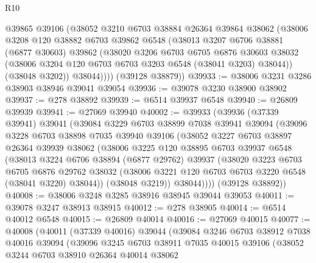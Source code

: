 \begin{lexlean}{R10}
\begin{coremodule}
          @39865
          @39106
          (@38052
            @3210
            @6703
            @38884
            @26364
            @39864
            @38062
            (@38006
              @3208
              @120
              @38882
              @6703
              @39862
              @6548
              (@38013
                @3207
                @6706
                @38881
                (@6877 @30603)
                @39862
                (@38020
                  @3206
                  @6703
                  @6705
                  @6876
                  @30603
                  @38032
                  (@38006 @3204 @120 @6703 @6703 @3203 @6548 (@38041 @3203) @38044))
                (@38048 @3202))
              @38044))))
      (@39128 @38879))
@39933 := @38006 @3231 @3286 @38903 @38946 @39041 @39054
@39936 := @39078 @3230 @38900 @38902
@39937 := @278 @38892
@39939 := @6514 @39937 @6548
@39940 := @26809 @39939
@39941 := @27069 @39940
@40002 := @39933
    (@39936
      (@37339 @39941)
      @39041
      (@39084
        @3229
        @6703
        @38899
        @7038
        @39941
        @39094
        (@39096
          @3228
          @6703
          @38898
          @7035
          @39940
          @39106
          (@38052
            @3227
            @6703
            @38897
            @26364
            @39939
            @38062
            (@38006
              @3225
              @120
              @38895
              @6703
              @39937
              @6548
              (@38013
                @3224
                @6706
                @38894
                (@6877 @29762)
                @39937
                (@38020
                  @3223
                  @6703
                  @6705
                  @6876
                  @29762
                  @38032
                  (@38006 @3221 @120 @6703 @6703 @3220 @6548 (@38041 @3220) @38044))
                (@38048 @3219))
              @38044))))
      (@39128 @38892))
@40008 := @38006 @3248 @3285 @38916 @38945 @39044 @39053
@40011 := @39078 @3247 @38913 @38915
@40012 := @278 @38905
@40014 := @6514 @40012 @6548
@40015 := @26809 @40014
@40016 := @27069 @40015
@40077 := @40008
    (@40011
      (@37339 @40016)
      @39044
      (@39084
        @3246
        @6703
        @38912
        @7038
        @40016
        @39094
        (@39096
          @3245
          @6703
          @38911
          @7035
          @40015
          @39106
          (@38052
            @3244
            @6703
            @38910
            @26364
            @40014
            @38062

\end{coremodule}
\end{lexlean}
